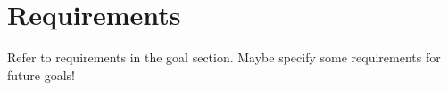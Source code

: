 \section{Requirements} %
\label{sec:requirements}

Refer to requirements in the goal section. Maybe specify some requirements for future goals!

